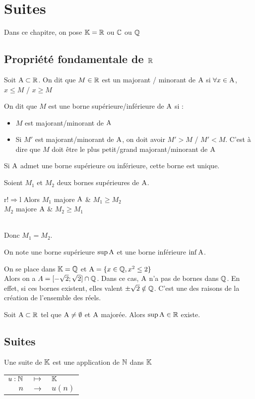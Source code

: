 \chapter{Suites}
Dans ce chapitre, on pose $\KK = \RR$ ou $\CC$ ou $\QQ$

\section{Propriété fondamentale de $\RR$}
Soit $\AA \subset \RR$.
On dit que $M \in \RR$ est un majorant / minorant de $\AA$ si $\forall x \in \AA$, $x \leq M$ / $x \geq M$

On dit que $M$ est une borne supérieure/inférieure de $\AA$ si :
\begin{itemize}
	\item $M$ est majorant/minorant de $\AA$
	\item Si $M'$ est majorant/minorant de $\AA$, on doit avoir $M'>M$ / $M'<M$. C'est à dire que $M$ doit être le plus petit/grand majorant/minorant de $\AA$
\end{itemize}

\prop{}
Si $\AA$ admet une borne supérieure ou inférieure, cette borne est unique.

\demonstration{}
Soient $M_1$ et $M_2$ deux bornes supérieures de $\AA$.\\
\begin{tabular}{r!{$\Rightarrow$}l}
	Alors $M_1$ majore $\AA$ & $M_1 \geq M_2$\\
	$M_2$ majore $\AA$ & $M_2 \geq M_1$
\end{tabular}\\
Donc $M_1=M_2$.

\notation{}
On note une borne supérieure $\sup \AA$ et une borne inférieure $\inf \AA$.

\remarque{}
On se place dans $\KK = \QQ$ et $\AA = \{x\in \QQ, x^2\leq 2\}$\\
Alors on a $A =[-\sqrt{2};\sqrt{2}] \cap \QQ$. Dans ce cas, $\AA$ n'a pas de bornes dans $\QQ$. En effet, si ces bornes existent, elles valent $\pm \sqrt{2} \notin \QQ$. C'est une des raisons de la création de l'ensemble des réels.

\axiome{}
Soit $\AA \subset \RR$ tel que $\AA \neq \emptyset$ et $\AA$ majorée. Alors $\sup \AA \in \RR$ existe.

\section{Suites}
Une suite de $\KK$ est une application de $\NN$ dans $\KK$\\
\begin{tabular}{rcl}
$u:\NN$ &$\longmapsto$&$\KK$\\
$n$&$\rightarrow$&$u(n)$
\end{tabular}

